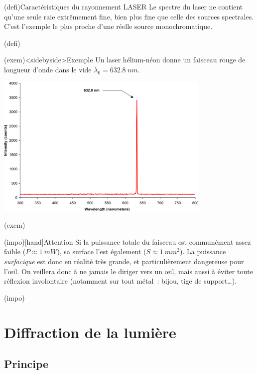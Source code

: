 \documentclass[../../main/main.tex]{subfiles}
\begin{document}
\begin{tcb}(defi){Caractéristiques du rayonnement LASER}
	Le spectre du laser ne contient qu'une seule raie extrêmement fine, bien
	plus fine que celle des sources spectrales. C'est l'exemple le plus proche
	d'une réelle source monochromatique.
\end{tcb}(defi)

\begin{tcb}(exem)<sidebyside>{Exemple}
	Un laser hélium-néon donne un faisceau rouge de longueur d'onde dans le vide
	$\lambda_0 = \SI{632.8}{nm}$.
	\tcblower
	\begin{center}
		\includegraphics[width=.8\linewidth]{ch1_fig4.png}
		\label{fig:laser_spec}
	\end{center}
\end{tcb}(exem)
\begin{tcb}(impo)[hand]{Attention}
	Si la puissance totale du faisceau est communément assez faible ($P \approx
		\SI{1}{mW}$), sa surface l'est également ($S \approx \SI{1}{mm^2}$). La
	puissance \textit{surfacique} est donc en réalité très grande, et
	particulièrement dangereuse pour l'œil. On veillera donc à ne jamais le
	diriger vers un œil, mais aussi à éviter toute réflexion involontaire
	(notamment sur tout métal~: bijou, tige de support…).
\end{tcb}(impo)

\section{Diffraction de la lumière}

\subsection{Principe}
\end{document}
